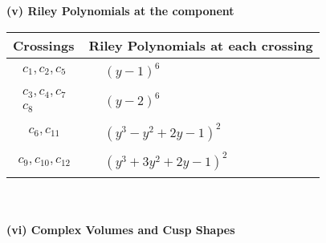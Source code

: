\documentclass[1p]{elsarticle_modified}
\theoremstyle{definition}
\begin{document}
\newpage\renewcommand{\arraystretch}{1}
\flushleft \textbf{(v) Riley Polynomials at the component}\newline \\
\begin{tabular}{m{50pt}|m{274pt}}
Crossings & \hspace{64pt}Riley Polynomials at each crossing \\
\hline $$\begin{aligned}c_{1},c_{2},c_{5}\end{aligned}$$&$\begin{aligned}
&(y-1)^6
\end{aligned}$\\
\hline $$\begin{aligned}c_{3},c_{4},c_{7}\\c_{8}\end{aligned}$$&$\begin{aligned}
&(y-2)^6
\end{aligned}$\\
\hline $$\begin{aligned}c_{6},c_{11}\end{aligned}$$&$\begin{aligned}
&(y^3- y^2+2 y-1)^2
\end{aligned}$\\
\hline $$\begin{aligned}c_{9},c_{10},c_{12}\end{aligned}$$&$\begin{aligned}
&(y^3+3 y^2+2 y-1)^2
\end{aligned}$\\
\hline
\end{tabular}\\~\\
\newpage\flushleft \textbf{(vi) Complex Volumes and Cusp Shapes}
\end{document}

